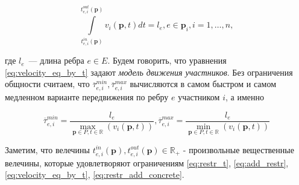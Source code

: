 \documentclass[12pt, a4paper]{article}
\begin{document}
\begin{equation}
	\label{eq:velocity_eq_by_t}
	\int\limits_{t_{e, i}^{in}(\textbf{p})}^{t_{e, i}^{out}(\textbf{p})} v_i(\textbf{p}, t) dt = l_e, e \in \textbf{p}_i, i = 1, \dots, n,
\end{equation}

где $l_e$~--- длина ребра $e \in E$. Будем говорить, что уравнения \eqref{eq:velocity_eq_by_t} задают \textit{модель движения участников}. Без ограничения общности считаем, что $\overline{\tau}_{e, i}^{min}, \overline{\tau}_{e, i}^{max}$ вычисляются в самом быстром и самом медленном варианте передвижения по ребру $e$ участником $i$, а именно

\begin{equation}
	\label{eq:restr_add_concrete}
	\overline{\tau}_{e, i}^{min} = \frac{l_e}{\max\limits_{\textbf{p} \in P, t \in \mathbb{R}} \left(  v_i(\textbf{p}, t) \right)}, \overline{\tau}_{e, i}^{max} = \frac{l_e}{\min\limits_{\textbf{p} \in P, t \in \mathbb{R}} \left(  v_i(\textbf{p}, t) \right)}
\end{equation}

Заметим, что велечины $t_{e, i}^{in}(\textbf{p}), t_{e, i}^{out}(\textbf{p}) \in \mathbb{R}_+$ - произвольные вещественные велечины, которые удовлетворяют ограничениям \eqref{eq:restr_t}, \eqref{eq:add_restr}, \eqref{eq:velocity_eq_by_t}, \eqref{eq:restr_add_concrete}.
\end{document}
